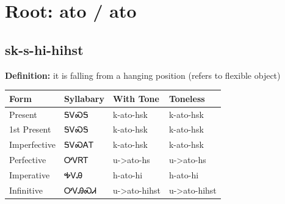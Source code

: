 \documentclass{article}%
\begin{document}
%
\normalsize%
\section*{Root: ato / ato}%
\subsection*{sk-s-hi-hihst}%
\textbf{Definition: }%
it is falling from a hanging position (refers to flexible object)%
\\[0.5em]%
\begin{tabular}{|l|l|l|l|}%
\hline%
\textbf{Form}&\textbf{Syllabary}&\textbf{With Tone}&\textbf{Toneless}\\%
\hline%
Present&ᎦᏙᏍᎦ&k{-}ato{-}hsk&k{-}ato{-}hsk\\%
1st Present&ᎦᏙᏍᎦ&k{-}ato{-}hsk&k{-}ato{-}hsk\\%
Imperfective&ᎦᏙᏍᎪᎢ&k{-}ato{-}hsk&k{-}ato{-}hsk\\%
Perfective&ᎤᏙᏒᎢ&u{-}>ato{-}hs&u{-}>ato{-}hs\\%
Imperative&ᎭᏙᎯ&h{-}ato{-}hi&h{-}ato{-}hi\\%
Infinitive&ᎤᏙᎯᏍᏗ&u{-}>ato{-}hihst&u{-}>ato{-}hihst\\%
\hline%
\end{tabular}%
\\[1em]%
\end{document}
